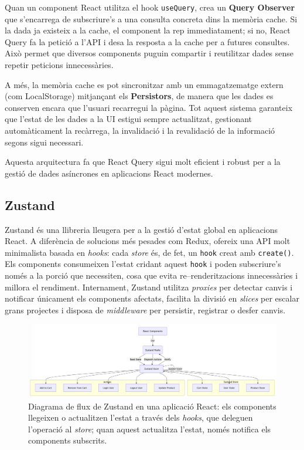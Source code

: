 Quan un component React utilitza el hook \texttt{useQuery}, crea un \textbf{Query Observer} que s'encarrega de subscriure's a una consulta concreta dins la memòria cache. Si la dada ja existeix a la cache, el component la rep immediatament; si no, React Query fa la petició a l'API i desa la resposta a la cache per a futures consultes. Això permet que diversos components puguin compartir i reutilitzar dades sense repetir peticions innecessàries.

A més, la memòria cache es pot sincronitzar amb un emmagatzematge extern (com LocalStorage) mitjançant els \textbf{Persistors}, de manera que les dades es conserven encara que l'usuari recarregui la pàgina. Tot aquest sistema garanteix que l'estat de les dades a la UI estigui sempre actualitzat, gestionant automàticament la recàrrega, la invalidació i la revalidació de la informació segons sigui necessari.

Aquesta arquitectura fa que React Query sigui molt eficient i robust per a la gestió de dades asíncrones en aplicacions React modernes.

\subsection*{Zustand}

Zustand és una llibreria lleugera per a la gestió d'estat global en aplicacions React.  
A diferència de solucions més pesades com Redux, ofereix una API molt minimalista basada en \emph{hooks}: cada \textit{store} és, de fet, un \texttt{hook} creat amb \verb|create()|.  
Els components consumeixen l'estat cridant aquest \texttt{hook} i poden subscriure's només a la porció que necessiten, cosa que evita re–renderitzacions innecessàries i millora el rendiment.  
Internament, Zustand utilitza \emph{proxies} per detectar canvis i notificar únicament els components afectats, facilita la divisió en \emph{slices} per escalar grans projectes i disposa de \emph{middleware} per persistir, registrar o desfer canvis.  

\begin{figure}[H]
  \centering
  \includegraphics[width=0.9\linewidth]{Figures/diagram.png}
  \caption{Diagrama de flux de Zustand en una aplicació React: els components llegeixen o actualitzen l'estat a través dels \emph{hooks}, que deleguen l'operació al \emph{store}; quan aquest actualitza l'estat, només notifica els components subscrits.}
  \label{fig:zustand-flow}
\end{figure}

